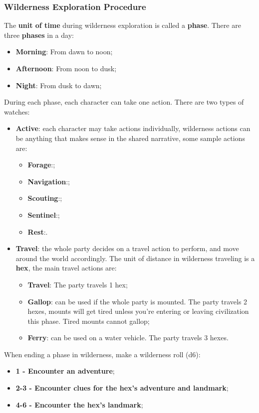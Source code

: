 \subsubsection{Wilderness Exploration Procedure}
The \textbf{unit of time} during wilderness exploration is called a \textbf{phase}. There are three \textbf{phases} in a day:
\begin{itemize}
    \item {\textbf{Morning}: From dawn to noon;}
    \item {\textbf{Afternoon}: From noon to dusk;}
    \item {\textbf{Night}: From dusk to dawn;}
\end{itemize}
During each phase, each character can take one action. There are two types of watches:
\begin{itemize}
    \item {\textbf{Active}: each character may take actions individually, wilderness actions can be anything that makes sense in the shared narrative, some sample actions are:
    \begin{itemize}
        \item {\textbf{Forage}:;}
        \item {\textbf{Navigation}:;}
        \item {\textbf{Scouting}:;}
        \item {\textbf{Sentinel}:;}
        \item {\textbf{Rest}:.}
    \end{itemize}
    }
    \item {\textbf{Travel}: the whole party decides on a travel action to perform, and move around the world accordingly. The unit of distance in wilderness traveling is a \textbf{hex}, the main travel actions are:
    \begin{itemize}
        \item {\textbf{Travel}: The party travels 1 hex;}
        \item {\textbf{Gallop}: can be used if the whole party is mounted. The party travels 2 hexes, mounts will get tired unless you're entering or leaving civilization this phase. Tired mounts cannot gallop;}
        \item {\textbf{Ferry}: can be used on a water vehicle. The party travels 3 hexes.}
    \end{itemize}
    }
\end{itemize}
When ending a phase in wilderness, make a wilderness roll (d6):
\begin{itemize}
    \item {\textbf{1 - Encounter an adventure};}
    \item {\textbf{2-3 - Encounter clues for the hex's adventure and landmark};}
    \item {\textbf{4-6 - Encounter the hex's landmark};}
\end{itemize}


